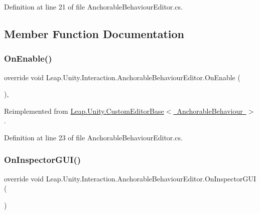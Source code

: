Definition at line 21 of file Anchorable\+Behaviour\+Editor.\+cs.



\subsection{Member Function Documentation}
\mbox{\label{class_leap_1_1_unity_1_1_interaction_1_1_anchorable_behaviour_editor_a6e5c7f06d6840902fde3326ad0ecb0a0}} 
\subsubsection{\texorpdfstring{OnEnable()}{OnEnable()}}
{\footnotesize\ttfamily override void Leap.\+Unity.\+Interaction.\+Anchorable\+Behaviour\+Editor.\+On\+Enable (\begin{DoxyParamCaption}{ }\end{DoxyParamCaption})\hspace{0.3cm}{\ttfamily [protected]}, {\ttfamily [virtual]}}



Reimplemented from \mbox{\hyperlink{class_leap_1_1_unity_1_1_custom_editor_base_a2268bc01655342bd3da5ae015bfa2f93}{Leap.\+Unity.\+Custom\+Editor\+Base$<$ Anchorable\+Behaviour $>$}}.



Definition at line 23 of file Anchorable\+Behaviour\+Editor.\+cs.

\mbox{\label{class_leap_1_1_unity_1_1_interaction_1_1_anchorable_behaviour_editor_a7ec140adf78746ff5657caa47f3b79b9}} 
\subsubsection{\texorpdfstring{OnInspectorGUI()}{OnInspectorGUI()}}
{\footnotesize\ttfamily override void Leap.\+Unity.\+Interaction.\+Anchorable\+Behaviour\+Editor.\+On\+Inspector\+G\+UI (\begin{DoxyParamCaption}{ }\end{DoxyParamCaption})}



